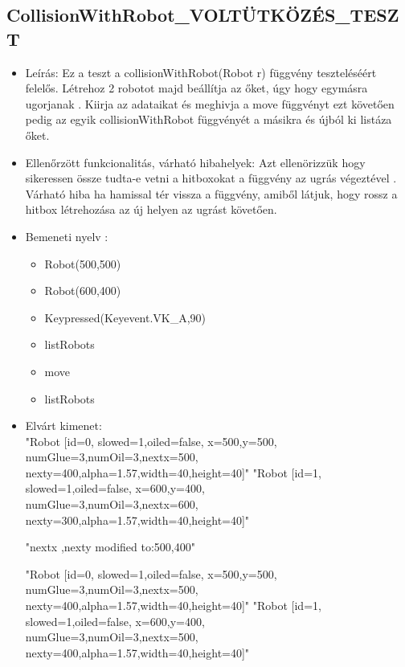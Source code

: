 \subsection{CollisionWithRobot\_VOLTÜTKÖZÉS\_TESZT}
\begin{itemize}
	\item Leírás: Ez a teszt a collisionWithRobot(Robot r) függvény teszteléséért felelős.
			Létrehoz 2 robotot majd beállítja az őket, úgy hogy egymásra ugorjanak .
			Kiirja az adataikat  és meghivja a move függvényt ezt követően pedig az egyik collisionWithRobot függvényét a másikra	és újból ki listáza őket.	\newline
	\item Ellenőrzött funkcionalitás, várható hibahelyek: Azt ellenörizzük hogy sikeressen össze tudta-e vetni a hitboxokat a függvény az ugrás végeztével .
	Várható hiba ha hamissal tér vissza a függvény, amiből látjuk, hogy rossz a hitbox létrehozása az új helyen az ugrást követően.
	\item Bemeneti nyelv :
		\begin{itemize}
		\item Robot(500,500)
		\item Robot(600,400)
		\item Keypressed(Keyevent.VK\_A,90)
		\item listRobots
		\item move
		\item listRobots
		\end{itemize}

	\item Elvárt kimenet: \\
		"Robot [id=0,  slowed=1,oiled=false, x=500,y=500, 
		\\numGlue=3,numOil=3,nextx=500,
		\\nexty=400,alpha=1.57,width=40,height=40]"\newline
		"Robot [id=1,  slowed=1,oiled=false, x=600,y=400, 
		\\numGlue=3,numOil=3,nextx=600,
		\\nexty=300,alpha=1.57,width=40,height=40]"
		
		"nextx ,nexty modified to:500,400"
	
		"Robot [id=0,  slowed=1,oiled=false, x=500,y=500, 
		\\numGlue=3,numOil=3,nextx=500,
		\\nexty=400,alpha=1.57,width=40,height=40]"\newline
		"Robot [id=1,  slowed=1,oiled=false, x=600,y=400, 
		\\numGlue=3,numOil=3,nextx=500,
		\\nexty=400,alpha=1.57,width=40,height=40]"


\end{itemize}
